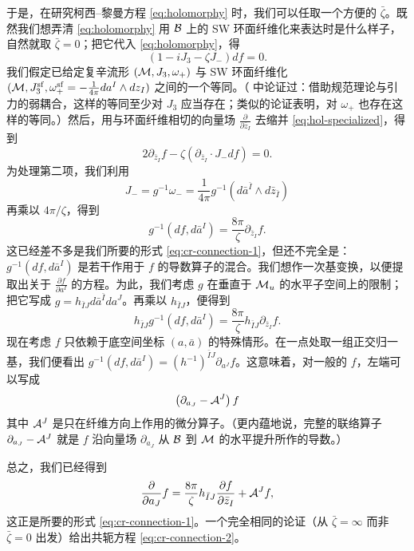 于是，在研究柯西--黎曼方程 \eqref{eq:holomorphy} 时，我们可以任取一个方便的 $\bar\zeta$。既然我们想弄清 \eqref{eq:holomorphy} 用 $\mathcal{B}$ 上的 SW 环面纤维化来表达时是什么样子，自然就取 $\bar\zeta=0$；把它代入 \eqref{eq:holomorphy}，得
\begin{equation} \label{eq:hol-specialized}
(1 - i J_3 - \zeta J_-) df = 0.
\end{equation}
我们假定已给定复辛流形 $(\mathcal{M}, J_3, \omega_+)$ 与 SW 环面纤维化 $(\mathcal{M}, J_3^{\mathrm{sf}}, \omega_+^{\mathrm{sf}} = - \frac{1}{4 \pi} da^I \wedge dz_I)$ 之间的一个等同。（\cite{Seiberg:1996nz} 中论证过：借助规范理论与引力的弱耦合，这样的等同至少对 $J_3$ 应当存在；类似的论证表明，对 $\omega_+$ 也存在这样的等同。）然后，用与环面纤维相切的向量场 $\frac{\partial}{\partial \bar{z}_I}$ 去缩并 \eqref{eq:hol-specialized}，得到
\begin{equation}
2 \partial_{\bar{z}_I} f - \zeta \left( \partial_{\bar{z}_I} \cdot J_- df \right) = 0.
\end{equation}
为处理第二项，我们利用
\begin{equation}
J_- = g^{-1} \omega_- =  \frac{1}{4 \pi} g^{-1}(d\bar{a}^{\bar I}
\wedge d\bar{z}_{\bar I})
\end{equation}
再乘以 $4 \pi / \zeta$，得到
\begin{equation}
g^{-1}(df, d \bar{a}^I) =  \frac{8 \pi}{\zeta} \partial_{\bar{z}_I} f.
\end{equation}
这已经差不多是我们所要的形式 \eqref{eq:cr-connection-1}，但还不完全是：$g^{-1}(df, d \bar{a}^I)$ 是若干作用于 $f$ 的导数算子的混合。我们想作一次基变换，以便提取出关于 $\frac{\partial f}{\partial a^I}$ 的方程。为此，我们考虑 $g$ 在垂直于 $\mathcal{M}_u$ 的水平子空间上的限制；把它写成 $g = h_{\bar{I} J} d\bar{a}^{\bar I} da^J$。再乘以 $h_{\bar{I} J}$，便得到
\begin{equation}
h_{\bar{I} J} g^{-1}(df, d \bar{a}^I) =  \frac{8 \pi}{\zeta}
h_{\bar{I} J} \partial_{\bar{z}_I} f.
\end{equation}
现在考虑 $f$ 只依赖于底空间坐标 $(a, \bar{a})$ 的特殊情形。在一点处取一组正交归一基，我们便看出 $g^{-1}(df, d \bar{a}^I) = (h^{-1})^{\bar{I} J} \partial_{a^J} f$。这意味着，对一般的 $f$，左端可以写成
\begin{equation}
\left( \partial_{a_J} - \mathcal{A}^J \right) f
\end{equation}
其中 $\mathcal{A}^J$ 是只在纤维方向上作用的微分算子。（更内蕴地说，完整的联络算子 $\partial_{a_J} - \mathcal{A}^J$ 就是 $f$ 沿向量场 $\partial_{a_J}$ 从 $\mathcal{B}$ 到 $\mathcal{M}$ 的水平提升所作的导数。）

总之，我们已经得到
\begin{equation}
\frac{\partial}{\partial a_J} f = \frac{8 \pi}{\zeta} h_{\bar{I} J}
\frac{\partial f}{\partial \bar{z}_I} + \mathcal{A}^J f,
\end{equation}
这正是所要的形式 \eqref{eq:cr-connection-1}。一个完全相同的论证（从 $\bar\zeta = \infty$ 而非 $\bar\zeta = 0$ 出发）给出共轭方程 \eqref{eq:cr-connection-2}。

